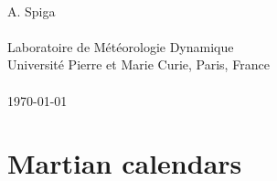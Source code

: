 \begin{titlepage}
\begin{center}
\end{center}
\mbox{}\\ 
\begin{center}
\huge{A. Spiga}\\
\\
Laboratoire de M\'et\'eorologie Dynamique\\
Universit\'e Pierre et Marie Curie, Paris, France\\
\mbox{}\\ 
\large \today \normalsize
\end{center} 
\end{titlepage} 


\clearemptydoublepage


\dominitoc
{}
\tableofcontents
\clearemptydoublepage


\mainmatter

%  
%
%
%
\clearemptydoublepage
{}

















\backmatter

\appendix
\chapter{Martian calendars}

\sk
\scriptsize
{}
\normalsize

\footnotesize{

%
%
%

}


